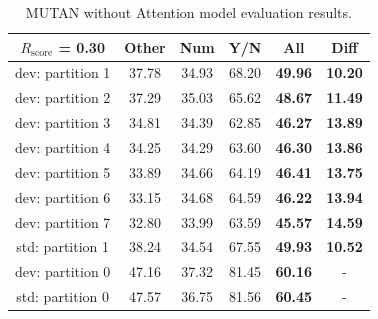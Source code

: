 \documentclass[letterpaper]{article}
\newcommand{\rscore}{}\def\rscore/{$R_{\text{score}}$}
\begin{document}
\begin{table}
	\begin{subtable}{0.49\linewidth}
		\begin{tabular}{c | c c c c | c}
			\rscore/ = 0.30  & Other & Num   & Y/N   & All            & Diff           \\ [0.5ex]
			\hline
			dev: partition 1 & 37.78 & 34.93 & 68.20 & \textbf{49.96} & \textbf{10.20} \\
			dev: partition 2 & 37.29 & 35.03 & 65.62 & \textbf{48.67} & \textbf{11.49} \\
			dev: partition 3 & 34.81 & 34.39 & 62.85 & \textbf{46.27} & \textbf{13.89} \\
			dev: partition 4 & 34.25 & 34.29 & 63.60 & \textbf{46.30} & \textbf{13.86} \\
			dev: partition 5 & 33.89 & 34.66 & 64.19 & \textbf{46.41} & \textbf{13.75} \\
			dev: partition 6 & 33.15 & 34.68 & 64.59 & \textbf{46.22} & \textbf{13.94} \\
			dev: partition 7 & 32.80 & 33.99 & 63.59 & \textbf{45.57} & \textbf{14.59} \\
			\hline
			std: partition 1 & 38.24 & 34.54 & 67.55 & \textbf{49.93} & \textbf{10.52} \\
			\hline
			dev: partition 0 & 47.16 & 37.32 & 81.45 & \textbf{60.16} & -              \\
			std: partition 0 & 47.57 & 36.75 & 81.56 & \textbf{60.45} & -              \\
			\hline
		\end{tabular}
		\caption{MUTAN without Attention model evaluation results.}


\end{subtable}
\end{table}
\end{document}
